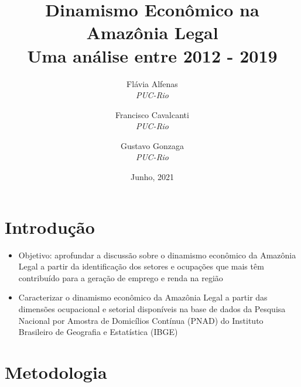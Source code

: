 \documentclass[8pt]{beamer}
\author{
Flávia  Alfenas\\
\textit{PUC-Rio}\\ \vspace{3mm}
\and  
Francisco Cavalcanti\\
\textit{PUC-Rio}\\ \vspace{3mm}
\and   
Gustavo Gonzaga \\
\textit{PUC-Rio} 
}
\date{Junho, 2021}
\title{Dinamismo Econômico na Amazônia Legal \\ Uma análise entre 2012 - 2019}
\begin{document}

\begin{frame}
\titlepage
\end{frame}


\section{Introdução}

\begin{frame}
\begin{itemize}
\item{Objetivo: aprofundar a discussão sobre o dinamismo econômico da Amazônia Legal a partir da identificação dos setores e ocupações que mais têm contribuído para a geração de emprego e renda na região}

\vspace{2mm}

\item{Caracterizar o dinamismo econômico da Amazônia Legal a partir das dimensões ocupacional e setorial disponíveis na base de dados da Pesquisa Nacional por Amostra de Domicílios Contínua (PNAD) do Instituto Brasileiro de Geografia e Estatística (IBGE)}
\end{itemize}
\end{frame}

\section{Metodologia}
\end{document}
